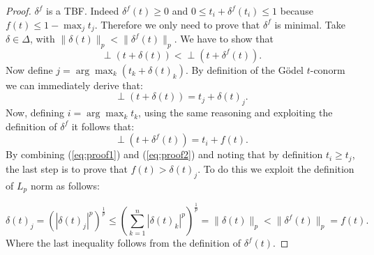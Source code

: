 \begin{proof}
	$\delta^f$ is a TBF. Indeed $\delta^f(t) \geq 0$ and $0 \leq t_i + \delta^f(t_i) \leq 1$ because $f(t) \leq 1- \max_j t_j$. Therefore we only need to prove that $\delta^f$ is minimal. Take $\delta \in \Delta$, with $\|\delta(t)\|_p < \|\delta^f(t)\|_p$. We have to show that $$\perp\left(t+\delta\left(t\right)\right) < \perp\left(t+\delta^f\left(t\right)\right).$$ 
	Now define $j=\arg\max_k \left(t_k + \delta(t)_k\right)$. By definition of the Gödel $t$-conorm we can immediately derive that:
	\begin{equation}
	\perp(t+\delta(t)) = t_j+\delta(t)_j.
	\label{eq:proof1}
	\end{equation}
	Now, defining $i=\arg\max_k t_k$, using the same reasoning and exploiting the definition of $\delta^f$ it follows that:
	\begin{equation}
	\perp(t+\delta^f(t)) = t_i + f(t).
	\label{eq:proof2}
	\end{equation}
	By combining (\ref{eq:proof1}) and (\ref{eq:proof2}) and noting that by definition $t_i \geq t_j$, the last step is to prove that $f(t) > \delta(t)_j$. To do this we exploit the definition of $L_p$ norm as follows:
	
	$$ \delta(t)_j = (|\delta(t)_j|^p)^\frac{1}{p} \leq \left(\sum_{k=1}^{n}|\delta(t)_k|^p \right)^{\frac{1}{p}} = \|\delta(t)\|_p < \|\delta^f(t)\|_p = f(t). $$ 
	Where the last inequality follows from the definition of $\delta^f(t)$.
	
\end{proof}


